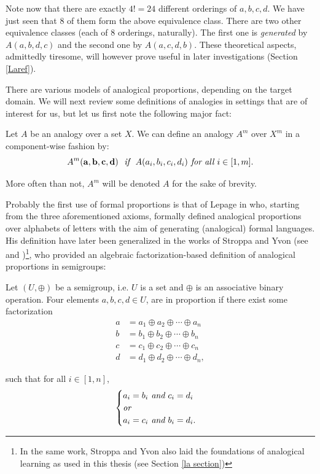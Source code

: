 Note now that there are exactly $4! = 24$ different orderings of $a, b, c, d$.
We have just seen that $8$ of them form the above equivalence class. There are
two other equivalence classes (each of $8$ orderings, naturally). The first one
is \textit{generated} by $A(a, b, d, c)$ and the second one by $A(a, c, d, b)$.
These theoretical aspects, admittedly tiresome, will however prove useful in
later investigations (Section \ref{Laref}).

There are various models of analogical proportions, depending on the target
domain. We will next review some definitions of analogies in settings that are
of interest for us, but let us first note the following major fact:

\begin{proposition}
  \label{PROPOS:analogy_for_vectors}
  Let $A$ be an analogy over a set $X$. We can define an analogy $A^m$
  over $X^m$ in a component-wise fashion by:
  $$A^m(\mathbf{a}, \mathbf{b}, \mathbf{c}, \mathbf{d}) ~ \emph{  if  } ~
  A(a_i, b_i, c_i, d_i) \emph{ for all } i \in [1, m].$$
\end{proposition}
\noindent
More often than not, $A^m$ will be denoted $A$ for the sake of brevity.

Probably the first use of formal proportions is that of Lepage in
\cite{Lep04} who, starting from the three aforementioned axioms, formally
defined analogical proportions over alphabets of letters with the aim of
generating (analogical) formal languages. His definition have later been
generalized in the works of Stroppa and Yvon (see \cite{StrYvoCNLL05} and
\cite{StrYvoREPORT05})\footnote{In the same work, Stroppa and Yvon also laid
the foundations of analogical learning as used in this thesis (see Section
\ref{la section})}, who provided an algebraic factorization-based definition of
analogical proportions in semigroups:

\begin{definition}
\label{DEF:proportion_semi_group}
Let $(U, \oplus)$ be a semigroup, i.e. $U$ is a set and $\oplus$ is an
  associative binary operation. Four elements $a, b, c, d \in U$, are in proportion if
  there exist some factorization
  \begin{align*}
    a &= a_1 \oplus a_2 \oplus \cdots \oplus a_n\\
    b &= b_1 \oplus b_2 \oplus \cdots \oplus b_n\\
    c &= c_1 \oplus c_2 \oplus \cdots \oplus c_n\\
    d &= d_1 \oplus d_2 \oplus \cdots \oplus d_n,
  \end{align*}

  such that for all $i \in [1, n]$, 
  $$
  \begin{cases}
    a_i = b_i \emph{ and } c_i = d_i\\
    \emph{or}\\
    a_i = c_i \emph{ and } b_i = d_i.
  \end{cases}
  $$
\end{definition}

